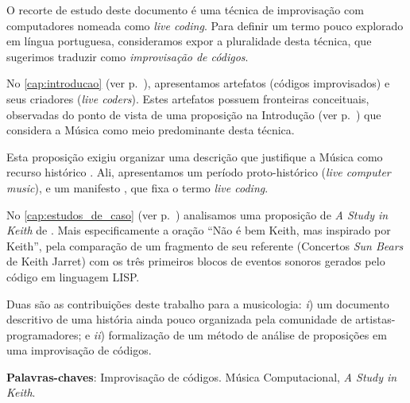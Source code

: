 
\setlength{\absparsep}{18pt} %
\begin{resumo}

O recorte de estudo deste documento é uma técnica de improvisação com computadores nomeada como \emph{live coding}. Para definir um termo pouco explorado em língua portuguesa, consideramos expor a pluralidade desta técnica, que sugerimos traduzir como \emph{improvisação de códigos}.

No \autoref{cap:introducao} (ver p.~\pageref{cap:introducao}), apresentamos artefatos (códigos improvisados) e seus criadores (\emph{live coders}). Estes artefatos possuem fronteiras conceituais, observadas do ponto de vista de uma proposição na Introdução (ver p.~\pageref{cap:intro}) que considera a Música como meio predominante desta técnica.

Esta proposição exigiu organizar uma descrição que justifique a Música como recurso histórico . Ali, apresentamos um período proto-histórico (\emph{live computer music}), e um manifesto \cite{ward_live_2004}, que fixa o termo \emph{live coding}.

No \autoref{cap:estudos_de_caso} (ver p.~\pageref{cap:estudos_de_caso}) analisamos uma proposição de \emph{A Study in Keith} de . Mais especificamente a oração ``Não é bem Keith, mas inspirado por Keith'', pela comparação de um fragmento de seu referente (Concertos \emph{Sun Bears} de Keith Jarret) com os três primeiros blocos de eventos sonoros gerados pelo código em linguagem LISP.

Duas são as contribuições deste trabalho para a musicologia: \emph{i}) um documento descritivo de uma história ainda pouco organizada pela comunidade de artistas-programadores; e \emph{ii}) formalização de um método de análise de proposições em uma improvisação de códigos.  

\vspace{\onelineskip}
\noindent
\textbf{Palavras-chaves}: Improvisação de códigos. Música Computacional, \emph{A Study in Keith}.
\end{resumo}

